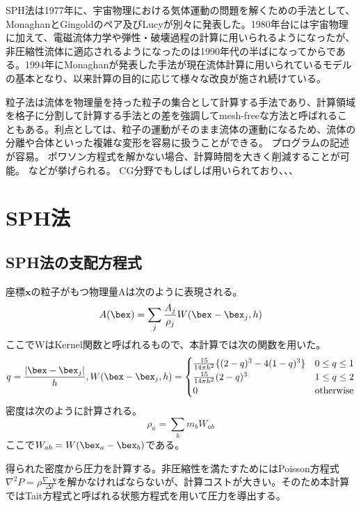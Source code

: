 \documentclass[]{jsarticle}
\begin{document}
SPH法は1977年に、宇宙物理における気体運動の問題を解くための手法として、MonaghanとGingold\cite{Gingold1977}のペア及びLucy\cite{Lucy1977}が別々に発表した。1980年台には宇宙物理に加えて、電磁流体力学や弾性・破壊過程の計算に用いられるようになったが、非圧縮性流体に適応されるようになったのは1990年代の半ばになってからである。1994年にMonaghan\cite{Monaghan1994}が発表した手法が現在流体計算に用いられているモデルの基本となり、以来計算の目的に応じて様々な改良が施され続けている。

粒子法は流体を物理量を持った粒子の集合として計算する手法であり、計算領域を格子に分割して計算する手法との差を強調してmesh-freeな方法と呼ばれることもある。利点としては、粒子の運動がそのまま流体の運動になるため、流体の分離や合体といった複雑な変形を容易に扱うことができる。
プログラムの記述が容易。
ポワソン方程式を解かない場合、計算時間を大きく削減することが可能。
などが挙げられる。
CG分野でもしばしば用いられており、、、

\section{SPH法}
\subsection{SPH法の支配方程式}
座標$\bm{x}$の粒子がもつ物理量Aは次のように表現される。 \cite{Becker2007}
\begin{equation}
A(\bex)=\sum_j \frac{A_j}{\rho_j} W(\bex-\bex_j,h)
\end{equation}
ここでWはKernel関数と呼ばれるもので、本計算では次の関数を用いた。
\begin{equation}
  q=\frac{|\bex-\bex_j|}{h}, 
  W(\bex-\bex_j,h)=\begin{cases}
    \frac{15}{14\pi h^2} \{(2-q)^3-4(1-q)^3\} & \text{$ 0 \leq q \leq 1$}\\
    \frac{15}{14\pi h^2} (2-q)^3 & \text{$1\leq q \leq 2$}\\
    0 & \text{otherwise}
\end{cases}
\end{equation}
密度は次のように計算される。
\begin{equation}
\rho_{a}=\sum_bm_bW_{ab}
\end{equation}
ここで$W_{ab}=W(\bex_a-\bex_b)$である。

得られた密度から圧力を計算する。非圧縮性を満たすためにはPoisson方程式$\nabla^2P=\rho\frac{\nabla\cdot\bm{v}}{\Delta t}$を解かなければならないが、計算コストが大きい。そのため本計算ではTait方程式と呼ばれる状態方程式を用いて圧力を導出する。
\end{document}
